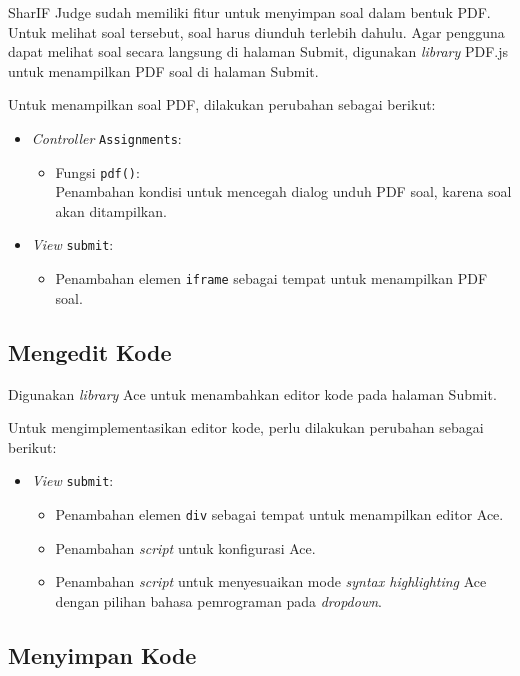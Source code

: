 SharIF Judge sudah memiliki fitur untuk menyimpan soal dalam bentuk PDF. Untuk melihat soal tersebut, soal harus diunduh terlebih dahulu. Agar pengguna dapat melihat soal secara langsung di halaman Submit, digunakan \textit{library} PDF.js untuk menampilkan PDF soal di halaman Submit.

Untuk menampilkan soal PDF, dilakukan perubahan sebagai berikut:
\begin{itemize}
	\item \textit{Controller} \verb|Assignments|:
    \begin{itemize}
		\item Fungsi \verb|pdf()|: \\ Penambahan kondisi untuk mencegah dialog unduh PDF soal, karena soal akan ditampilkan.
    \end{itemize}
    \item \textit{View} \verb|submit|:
    \begin{itemize}
        \item Penambahan elemen \verb|iframe| sebagai tempat untuk menampilkan PDF soal.
    \end{itemize}
\end{itemize}

\subsection{Mengedit Kode}
\label{subsec:4:editor}

Digunakan \textit{library} Ace untuk menambahkan editor kode pada halaman Submit.

Untuk mengimplementasikan editor kode, perlu dilakukan perubahan sebagai berikut:
\begin{itemize}
    \item \textit{View} \verb|submit|:
    \begin{itemize}
        \item Penambahan elemen \verb|div| sebagai tempat untuk menampilkan editor Ace.
        \item Penambahan \textit{script} untuk konfigurasi Ace.
        \item Penambahan \textit{script} untuk menyesuaikan mode \textit{syntax highlighting} Ace dengan pilihan bahasa pemrograman pada \textit{dropdown}.
    \end{itemize}
\end{itemize}

\subsection{Menyimpan Kode}
\label{subsec:4:simpan}

